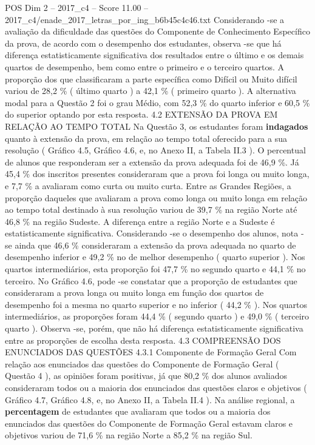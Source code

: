 \begin{textsample}{POS Dim 2 – 2017\_c4 – Score 11.00 – 2017\_c4/enade\_2017\_letras\_por\_ing\_b6b45c4c46.txt}
Considerando -se a avaliação da dificuldade das questões do Componente de Conhecimento Específico da prova, de acordo com o desempenho dos estudantes, observa -se que há diferença estatisticamente significativa dos resultados entre o último e os demais quartos de desempenho, bem como entre o primeiro e o terceiro quartos.
A proporção dos que classificaram a parte específica como Difícil ou Muito difícil variou de 28,2 \% ( último quarto ) a 42,1 \% ( primeiro quarto ).
A alternativa modal para a Questão 2 foi o grau Médio, com 52,3 \% do quarto inferior e 60,5 \% do superior optando por esta resposta. 4.2 EXTENSÃO DA PROVA EM RELAÇÃO AO TEMPO TOTAL Na Questão 3, os estudantes foram \textbf{indagados} quanto à extensão da prova, em relação ao tempo total oferecido para a sua resolução ( Gráfico 4.5, Gráfico 4.6, e, no Anexo II, a Tabela II.3 ).
O percentual de alunos que responderam ser a extensão da prova adequada foi de 46,9 \%.
Já 45,4 \% dos inscritos presentes consideraram que a prova foi longa ou muito longa, e 7,7 \% a avaliaram como curta ou muito curta.
Entre as Grandes Regiões, a proporção daqueles que avaliaram a prova como longa ou muito longa em relação ao tempo total destinado à sua resolução variou de 39,7 \% na região Norte até 46,8 \% na região Sudeste.
A diferença entre a região Norte e a Sudeste é estatisticamente significativa.
Considerando -se o desempenho dos alunos, nota -se ainda que 46,6 \% consideraram a extensão da prova adequada no quarto de desempenho inferior e 49,2 \% no de melhor desempenho ( quarto superior ).
Nos quartos intermediários, esta proporção foi 47,7 \% no segundo quarto e 44,1 \% no terceiro.
No Gráfico 4.6, pode -se constatar que a proporção de estudantes que consideraram a prova longa ou muito longa em função dos quartos de desempenho foi a mesma no quarto superior e no inferior ( 44,2 \% ).
Nos quartos intermediários, as proporções foram 44,4 \% ( segundo quarto ) e 49,0 \% ( terceiro quarto ).
Observa -se, porém, que não há diferença estatisticamente significativa entre as proporções de escolha desta resposta. 4.3 COMPREENSÃO DOS ENUNCIADOS DAS QUESTÕES 4.3.1 Componente de Formação Geral Com relação aos enunciados das questões do Componente de Formação Geral ( Questão 4 ), as opiniões foram positivas, já que 80,2 \% dos alunos avaliados consideraram todos ou a maioria dos enunciados das questões claros e objetivos ( Gráfico 4.7, Gráfico 4.8, e, no Anexo II, a Tabela II.4 ).
Na análise regional, a \textbf{percentagem} de estudantes que avaliaram que todos ou a maioria dos enunciados das questões do Componente de Formação Geral estavam claros e objetivos variou de 71,6 \% na região Norte a 85,2 \% na região Sul.

\end{textsample}
